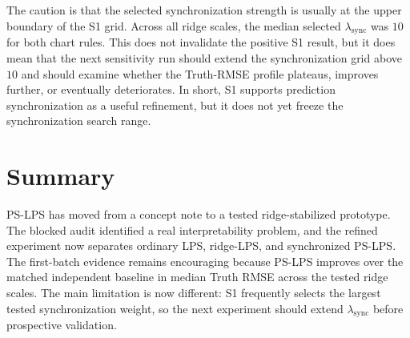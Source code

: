 \documentclass[11pt]{article}
\begin{document}
The caution is that the selected synchronization strength is usually at the
upper boundary of the S1 grid.  Across all ridge scales, the median selected
\(\lambda_{\mathrm{sync}}\) was \(10\) for both chart rules.  This does not
invalidate the positive S1 result, but it does mean that the next sensitivity
run should extend the synchronization grid above \(10\) and should examine
whether the Truth-RMSE profile plateaus, improves further, or eventually
deteriorates.  In short, S1 supports prediction synchronization as a useful
refinement, but it does not yet freeze the synchronization search range.

\section*{Summary}

PS-LPS has moved from a concept note to a tested ridge-stabilized prototype.
The blocked audit identified a real interpretability problem, and the refined
experiment now separates ordinary LPS, ridge-LPS, and synchronized PS-LPS.  The
first-batch evidence remains encouraging because PS-LPS improves over the
matched independent baseline in median Truth RMSE across the tested ridge
scales.  The main limitation is now different: S1 frequently selects the largest
tested synchronization weight, so the next experiment should extend
\(\lambda_{\mathrm{sync}}\) before prospective validation.
\end{document}
